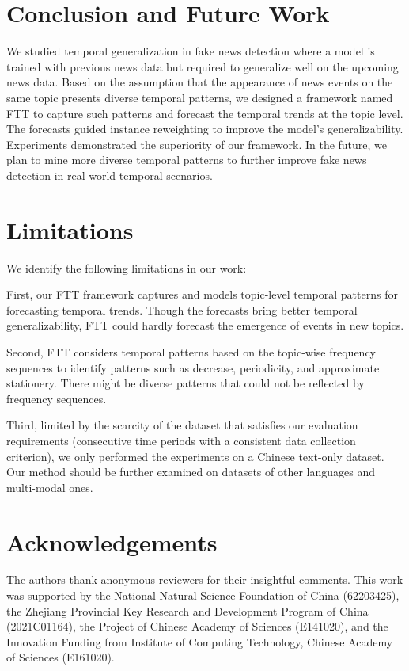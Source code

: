 \documentclass[11pt]{article}
\begin{document}
\section{Conclusion and Future Work}

We studied temporal generalization in fake news detection where a model is trained with previous news data but required to generalize well on the upcoming news data.
Based on the assumption that the appearance of news events on the same topic presents diverse temporal patterns, we designed a framework named FTT to capture such patterns and forecast the temporal trends at the topic level. The forecasts guided instance reweighting to improve the model's generalizability. Experiments demonstrated the superiority of our framework. In the future, we plan to mine more diverse temporal patterns to further improve fake news detection in real-world temporal scenarios.

\section*{Limitations}
We identify the following limitations in our work:

First, our FTT framework captures and models topic-level temporal patterns for forecasting temporal trends. Though the forecasts bring better temporal generalizability, FTT could hardly forecast the emergence of events in new topics. 

Second, FTT considers temporal patterns based on the topic-wise frequency sequences to identify patterns such as decrease,  periodicity, and approximate stationery. There might be diverse patterns that could not be reflected by frequency sequences.

Third, limited by the scarcity of the dataset that satisfies our evaluation requirements (consecutive time periods with a consistent data collection criterion), we only performed the experiments on a Chinese text-only dataset. Our method should be further examined on datasets of other languages and multi-modal ones.

\section*{Acknowledgements}
The authors thank anonymous reviewers for their insightful comments. This work was supported by the National Natural Science Foundation of China (62203425), the Zhejiang Provincial Key Research and Development Program of China (2021C01164), the Project of Chinese Academy of Sciences (E141020), and the Innovation Funding from Institute of Computing Technology, Chinese Academy of Sciences (E161020).



\end{document}
